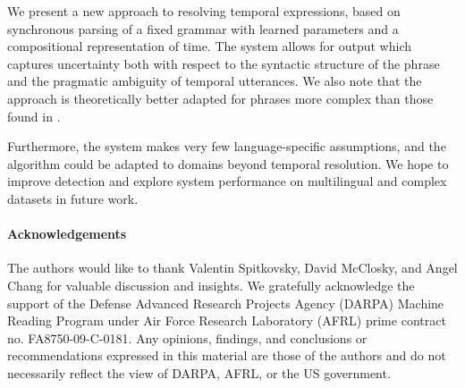 We present a new approach to resolving temporal expressions,
	based on synchronous parsing of a fixed grammar with learned parameters
	and a compositional representation of time.
The system allows for output which captures uncertainty both with respect to 
	the syntactic structure of the phrase and the pragmatic ambiguity of 
	temporal utterances.
We also note that the approach is theoretically better adapted for
	phrases more complex than those found in \tempeval.

Furthermore, the system makes very few language-specific assumptions,
	and the algorithm could be adapted to domains beyond temporal resolution.
We hope to improve detection and explore system performance
	on multilingual and complex datasets in future work.

{\footnotesize
\paragraph{\footnotesize Acknowledgements}
The authors would like to thank Valentin Spitkovsky, David McClosky,
	and Angel Chang for valuable discussion and insights.
We gratefully acknowledge the support of the Defense Advanced 
	Research Projects Agency (DARPA) Machine Reading Program under Air 
	Force Research Laboratory (AFRL) prime contract no. FA8750-09-C-0181. 
Any opinions, findings, and conclusions or recommendations expressed 
	in this material are those of the authors and do not necessarily 
	reflect the view of DARPA, AFRL, or the US government.
}
